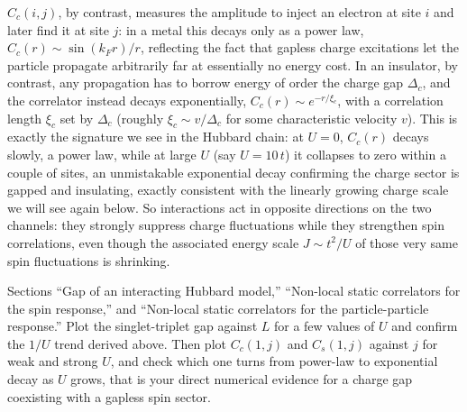 \documentclass[all_sessions.tex]{subfiles}
\begin{document}
$C_c(i,j)$, by contrast, measures the amplitude to inject an electron at site $i$ and later find it
at site $j$: in a metal this decays only as a power law, $C_c(r)\sim \sin(k_F r)/r$, reflecting the
fact that gapless charge excitations let the particle propagate arbitrarily far at essentially no
energy cost. In an insulator, by contrast, any propagation has to borrow energy of order the charge
gap $\Delta_c$, and the correlator instead decays exponentially, $C_c(r) \sim e^{-r/\xi_c}$, with a
correlation length $\xi_c$ set by $\Delta_c$ (roughly $\xi_c \sim v/\Delta_c$ for some
characteristic velocity $v$). This is exactly the signature we see in the Hubbard chain: at $U=0$,
$C_c(r)$ decays slowly, a power law, while at large $U$ (say $U=10\,t$) it collapses to zero within
a couple of sites, an unmistakable exponential decay confirming the charge sector is gapped and
insulating, exactly consistent with the linearly growing charge scale we will see again below. So
interactions act in opposite directions on the two channels: they strongly suppress charge
fluctuations while they strengthen spin correlations, even though the associated energy scale
$J\sim t^2/U$ of those very same spin fluctuations is shrinking.

\begin{notebook}
Sections ``Gap of an interacting Hubbard model,'' ``Non-local static correlators for the spin
response,'' and ``Non-local static correlators for the particle-particle response.'' Plot the
singlet-triplet gap against $L$ for a few values of $U$ and confirm the $1/U$ trend derived above.
Then plot $C_c(1,j)$ and $C_s(1,j)$ against $j$ for weak and strong $U$, and check which one turns
from power-law to exponential decay as $U$ grows, that is your direct numerical evidence for a
charge gap coexisting with a gapless spin sector.
\end{notebook}
\end{document}
